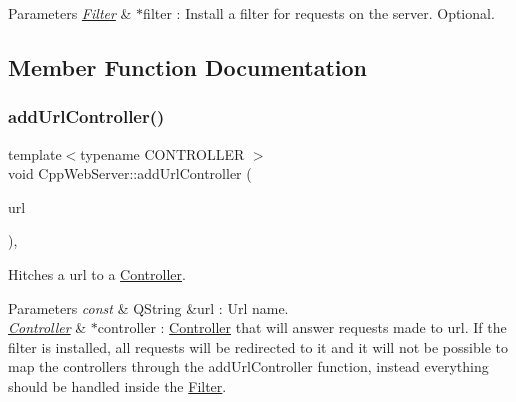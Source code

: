 \begin{DoxyParams}{Parameters}
{\em \hyperlink{class_filter}{Filter}} & $\ast$filter \+: Install a filter for requests on the server. Optional. \\
\hline
\end{DoxyParams}


\subsection{Member Function Documentation}
\mbox{\label{class_cpp_web_server_ab876ae8eb6d14b89b9f0a76739c1545d}} 
\subsubsection{\texorpdfstring{add\+Url\+Controller()}{addUrlController()}}
{\footnotesize\ttfamily template$<$typename C\+O\+N\+T\+R\+O\+L\+L\+ER $>$ \\
void Cpp\+Web\+Server\+::add\+Url\+Controller (\begin{DoxyParamCaption}\item[{const Q\+String \&}]{url }\end{DoxyParamCaption})\hspace{0.3cm}{\ttfamily [inline]}, {\ttfamily [noexcept]}}



Hitches a url to a \hyperlink{class_controller}{Controller}. 


\begin{DoxyParams}{Parameters}
{\em const} & Q\+String \&url \+: Url name. \\
\hline
{\em \hyperlink{class_controller}{Controller}} & $\ast$controller \+: \hyperlink{class_controller}{Controller} that will answer requests made to url. If the filter is installed, all requests will be redirected to it and it will not be possible to map the controllers through the add\+Url\+Controller function, instead everything should be handled inside the \hyperlink{class_filter}{Filter}. \\
\hline
\end{DoxyParams}
\mbox{\label{class_cpp_web_server_a49addc6ee3148d11134062e6b7a56791}} 
